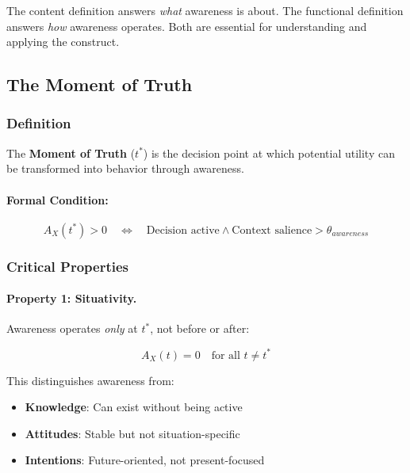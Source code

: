 The content definition answers \emph{what} awareness is about.
The functional definition answers \emph{how} awareness operates.
Both are essential for understanding and applying the construct.

\subsection{The Moment of Truth}
\label{subsec:moment-of-truth}

\subsubsection{Definition}

\begin{definition}
\label{def:moment-of-truth}
The \textbf{Moment of Truth} ($t^*$) is the decision point at which potential 
utility can be transformed into behavior through awareness.
\end{definition}

\paragraph{Formal Condition:}
\begin{equation}
A_X(t^*) > 0 \quad \Leftrightarrow \quad \text{Decision active} \wedge \text{Context salience} > \theta_{awareness}
\end{equation}

\subsubsection{Critical Properties}

\paragraph{Property 1: Situativity.}
Awareness operates \emph{only} at $t^*$, not before or after:

\begin{equation}
A_X(t) = 0 \quad \text{for all } t \neq t^*
\end{equation}

This distinguishes awareness from:
\begin{itemize}
\item \textbf{Knowledge}: Can exist without being active
\item \textbf{Attitudes}: Stable but not situation-specific
\item \textbf{Intentions}: Future-oriented, not present-focused
\end{itemize}


